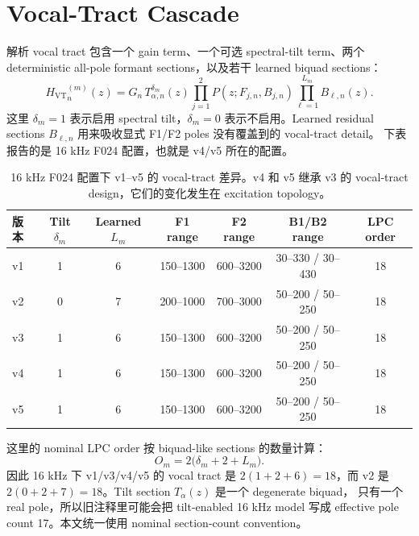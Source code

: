 \documentclass[11pt,fontset=none]{ctexart}
\newcommand{\vt}{H_{\mathrm{VT}}}
\newcommand{\biquad}{B}
\newcommand{\pole}{P}
\begin{document}
\section{Vocal-Tract Cascade}

解析 vocal tract 包含一个 gain term、一个可选 spectral-tilt term、两个 deterministic
all-pole formant sections，以及若干 learned biquad sections：
\begin{equation}
  {\vt}^{(m)}_n(z)
  =
  G_n
  \, T_{\alpha,n}^{\delta_m}(z)
  \prod_{j=1}^{2} \pole(z; F_{j,n}, B_{j,n})
  \prod_{\ell=1}^{L_m} \biquad_{\ell,n}(z).
  \label{eq:vt-general-zh}
\end{equation}
这里 $\delta_m=1$ 表示启用 spectral tilt，$\delta_m=0$ 表示不启用。Learned residual
sections $\biquad_{\ell,n}$ 用来吸收显式 F1/F2 poles 没有覆盖到的 vocal-tract detail。
下表报告的是 16 kHz F024 配置，也就是 v4/v5 所在的配置。

\begin{table}[H]
\centering
\small
\begin{tabular}{@{}lcccccc@{}}
\toprule
版本 & Tilt $\delta_m$ & Learned $L_m$ & F1 range & F2 range & B1/B2 range & LPC order \\
\midrule
v1 & 1 & 6 & 150--1300 & 600--3200 & 30--330 / 30--430 & 18 \\
v2 & 0 & 7 & 200--1000 & 700--3000 & 50--200 / 50--250 & 18 \\
v3 & 1 & 6 & 150--1300 & 600--3200 & 50--200 / 50--250 & 18 \\
v4 & 1 & 6 & 150--1300 & 600--3200 & 50--200 / 50--250 & 18 \\
v5 & 1 & 6 & 150--1300 & 600--3200 & 50--200 / 50--250 & 18 \\
\bottomrule
\end{tabular}
\caption{16 kHz F024 配置下 v1--v5 的 vocal-tract 差异。v4 和 v5 继承 v3 的
vocal-tract design，它们的变化发生在 excitation topology。}
\end{table}

这里的 nominal LPC order 按 biquad-like sections 的数量计算：
\begin{equation}
  O_m = 2\bigl(\delta_m + 2 + L_m\bigr).
\end{equation}
因此 16 kHz 下 v1/v3/v4/v5 的 vocal tract 是 $2(1+2+6)=18$，而 v2 是
$2(0+2+7)=18$。Tilt section $T_{\alpha}(z)$ 是一个 degenerate biquad，
只有一个 real pole，所以旧注释里可能会把 tilt-enabled 16 kHz model 写成 effective
pole count 17。本文统一使用 nominal section-count convention。
\end{document}
